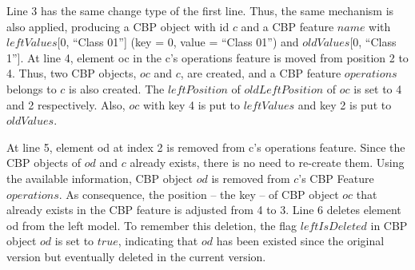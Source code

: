\documentclass{llncs}
\begin{document}
Line 3 has the same change type of the first line. Thus, the same mechanism is also applied, producing a CBP object with id $c$ and a CBP feature $name$ with $leftValues$[0, ``Class 01''] (key = 0, value = ``Class 01'') and $oldValues$[0, ``Class 1'']. At line 4, element \textsf{oc} in the \textsf{c}'s \textsf{operations} feature is moved from position 2 to 4. Thus, two CBP objects, $oc$ and $c$, are created, and a CBP feature $operations$ belongs to $c$ is also created. The $leftPosition$ of $oldLeftPosition$ of $oc$ is set to 4 and 2 respectively. Also, $oc$ with  key 4 is put to $leftValues$ and key 2 is put to $oldValues$. 

At line 5, element \textsf{od} at index 2 is removed from \textsf{c}'s \textsf{operations} feature. Since the CBP objects of $od$ and $c$ already exists, there is no need to re-create them. Using the available information, CBP object $od$ is removed from $c$'s CBP Feature $operations$. As consequence, the position -- the key -- of CBP object $oc$ that already exists in the CBP feature is adjusted from 4 to 3. Line 6 deletes element \textsf{od} from the left model. To remember this deletion, the flag $leftIsDeleted$ in CBP object $od$ is set to $true$, indicating that $od$ has been existed since the original version but eventually deleted in the current version. 
\end{document}
